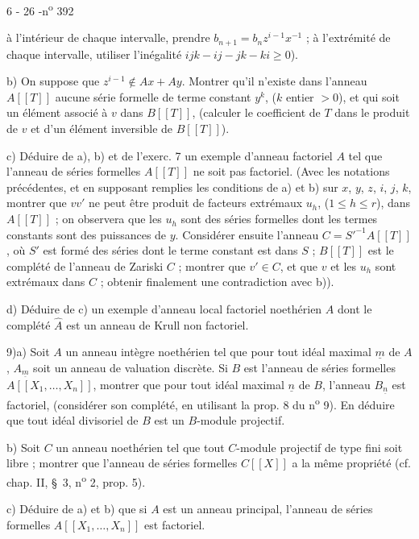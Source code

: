 
\begin{center}6 - 26 -\hfill n\textsuperscript{o} 392\end{center}

à l'intérieur de chaque intervalle, prendre $b_{n+1}=b_nz^{i-1}x^{-1}$ ; à l'extrémité de chaque intervalle, utiliser l'inégalité $ijk-ij-jk-ki\geq 0$).

b) On suppose que $z^{i-1}\notin Ax+Ay$. Montrer qu'il n'existe dans l'anneau $A[[T]]$ aucune série formelle de terme constant $y^k$, ($k$ entier $>0$), et qui soit un élément associé à $v$ dans $B[[T]]$, (calculer le coefficient de $T$ dans le produit de $v$ et d'un élément inversible de $B[[T]]$).

c) Déduire de a), b) et de l'exerc. 7 un exemple d'anneau factoriel $A$ tel que l'anneau de séries formelles $A[[T]]$ ne soit pas factoriel. (Avec les notations précédentes, et en supposant remplies les conditions de a) et b) sur $x$, $y$, $z$, $i$, $j$, $k$, montrer que $vv'$ ne peut être produit de facteurs extrémaux $u_h$, ($1\leq h\leq r$), dans $A[[T]]$ ; on observera que les $u_h$ sont des séries formelles dont les termes constants sont des puissances de $y$. Considérer ensuite l'anneau $C=S'^{-1}A[[T]]$, où $S'$ est formé des séries dont le terme constant est dans $S$ ; $B[[T]]$ est le complété de l'anneau de Zariski $C$ ; montrer que $v'\in C$, et que $v$ et les $u_h$ sont extrémaux dans $C$ ; obtenir finalement une contradiction avec b)).

d) Déduire de c) un exemple d'anneau local factoriel noethérien $A$ dont le complété $\widehat{A}$ est un anneau de Krull non factoriel.

9)\quad a) Soit $A$ un anneau intègre noethérien tel que pour tout idéal maximal $\underline{m}$ de $A$, $A_{\underline{m}}$ soit un anneau de valuation discrète. Si $B$ est l'anneau de séries formelles $A[[X_1,\ldots,X_n]]$, montrer que pour tout idéal maximal $\underline{n}$ de $B$, l'anneau $B_{\underline{n}}$ est factoriel, (considérer son complété, en utilisant la prop. 8 du n\textsuperscript{o} 9). En déduire que tout idéal divisoriel de $B$ est un $B$-module projectif.

b) Soit $C$ un anneau noethérien tel que tout $C$-module projectif de type fini soit libre ; montrer que l'anneau de séries formelles $C[[X]]$ a la même propriété (cf. chap. II, \S\ 3, n\textsuperscript{o} 2, prop. 5).

c) Déduire de a) et b) que si $A$ est un anneau principal, l'anneau de séries formelles $A[[X_1,\ldots,X_n]]$ est factoriel.

